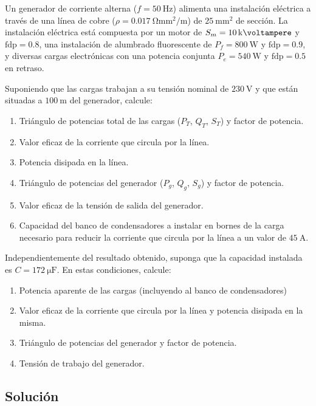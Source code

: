 Un generador de corriente alterna ($f = \SI{50}{\hertz}$) alimenta una instalación eléctrica a través de una línea de cobre ($\rho = \SI{0.017}{\ohm\milli\meter\squared\per\meter}$) de $\SI{25}{\milli\meter\squared}$ de sección. La instalación eléctrica está compuesta por un motor de $S_m = \SI{10}{\kilo\voltampere}$ y $\mathrm{fdp} = 0.8$, una instalación de alumbrado fluorescente de $P_f = \SI{800}{\watt}$ y $\mathrm{fdp} = 0.9$, y diversas cargas electrónicas con una potencia conjunta $P_e = \SI{540}{\watt}$ y $\mathrm{fdp} = 0.5$ en retraso.

Suponiendo que las cargas trabajan a su tensión nominal de $\SI{230}{\volt}$ y que están situadas a $\SI{100}{\meter}$ del generador, calcule:

\begin{enumerate}
\item Triángulo de potencias total de las cargas ($P_T$, $Q_T$, $S_T$) y factor de potencia.
\item Valor eficaz de la corriente que circula por la línea.
\item Potencia disipada en la línea.
\item Triángulo de potencias del generador ($P_g$, $Q_g$, $S_g$) y factor de potencia.
\item Valor eficaz de la tensión de salida del generador.
\item Capacidad del banco de condensadores a instalar en bornes de la carga necesario para reducir la corriente que circula por la línea a un valor de $\SI{45}{\ampere}$.
\end{enumerate}

Independientemente del resultado obtenido, suponga que la capacidad instalada es $C = \SI{172}{\micro\farad}$. En estas condiciones, calcule:
\begin{enumerate}[resume]
\item Potencia aparente de las cargas (incluyendo al banco de condensadores)
\item Valor eficaz de la corriente que circula por la línea y potencia disipada en la misma.
\item Triángulo de potencias del generador y factor de potencia.
\item Tensión de trabajo del generador.
\end{enumerate}

\subsection*{Solución}

